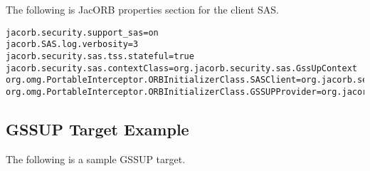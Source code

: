 The following is JacORB properties section for the client SAS.


\begin{scriptsize}
\begin{verbatim}
jacorb.security.support_sas=on
jacorb.SAS.log.verbosity=3
jacorb.security.sas.tss.stateful=true
jacorb.security.sas.contextClass=org.jacorb.security.sas.GssUpContext
org.omg.PortableInterceptor.ORBInitializerClass.SASClient=org.jacorb.security.sas.SASClientInitializer
org.omg.PortableInterceptor.ORBInitializerClass.GSSUPProvider=org.jacorb.security.sas.GSSUPProviderInitializer
\end{verbatim}
\end{scriptsize}

\subsection{GSSUP Target Example}

The following is a sample GSSUP target.

